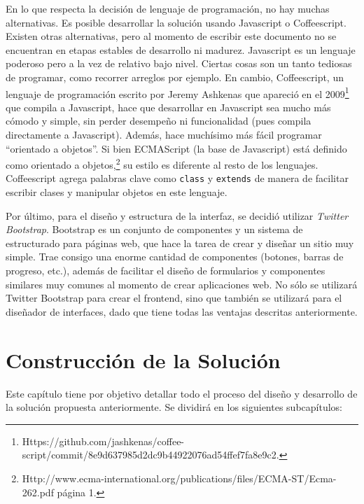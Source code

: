 \documentclass[12pt,titlepage,]{article}
\begin{document}
En lo que respecta la decisión de lenguaje de programación, no hay
muchas alternativas. Es posible desarrollar la solución usando
Javascript o Coffeescript. Existen otras alternativas, pero al momento
de escribir este documento no se encuentran en etapas estables de
desarrollo ni madurez. Javascript es un lenguaje poderoso pero a la vez
de relativo bajo nivel. Ciertas cosas son un tanto tediosas de
programar, como recorrer arreglos por ejemplo. En cambio, Coffeescript,
un lenguaje de programación escrito por Jeremy Ashkenas que apareció en
el 2009\footnote{Https://github.com/jashkenas/coffee-script/commit/8e9d637985d2dc9b44922076ad54ffef7fa8e9c2.}
que compila a Javascript, hace que desarrollar en Javascript sea mucho
más cómodo y simple, sin perder desempeño ni funcionalidad (pues compila
directamente a Javascript). Además, hace muchísimo más fácil programar
``orientado a objetos''. Si bien ECMAScript (la base de Javascript) está
definido como orientado a objetos,\footnote{Http://www.ecma-international.org/publications/files/ECMA-ST/Ecma-262.pdf
  página 1.} su estilo es diferente al resto de los lenguajes.
Coffeescript agrega palabras clave como \texttt{class} y
\texttt{extends} de manera de facilitar escribir clases y manipular
objetos en este lenguaje.

Por último, para el diseño y estructura de la interfaz, se decidió
utilizar \emph{Twitter Bootstrap}. Bootstrap es un conjunto de
componentes y un sistema de estructurado para páginas web, que hace la
tarea de crear y diseñar un sitio muy simple. Trae consigo una enorme
cantidad de componentes (botones, barras de progreso, etc.), además de
facilitar el diseño de formularios y componentes similares muy comunes
al momento de crear aplicaciones web. No sólo se utilizará Twitter
Bootstrap para crear el frontend, sino que también se utilizará para el
diseñador de interfaces, dado que tiene todas las ventajas descritas
anteriormente.

\clearpage
\newpage

\section{Construcción de la Solución}

Este capítulo tiene por objetivo detallar todo el proceso del diseño y
desarrollo de la solución propuesta anteriormente. Se dividirá en los
siguientes subcapítulos:
\end{document}
